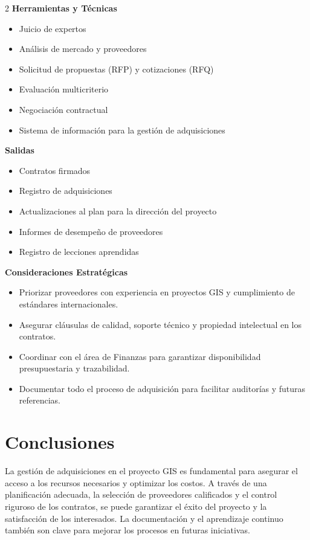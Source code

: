 \begin{multicols}{2}
\textbf{Herramientas y Técnicas}
\begin{itemize}
    \item Juicio de expertos
    \item Análisis de mercado y proveedores
    \item Solicitud de propuestas (RFP) y cotizaciones (RFQ)
    \item Evaluación multicriterio
    \item Negociación contractual
    \item Sistema de información para la gestión de adquisiciones
\end{itemize}

\textbf{Salidas}
\begin{itemize}
    \item Contratos firmados
    \item Registro de adquisiciones
    \item Actualizaciones al plan para la dirección del proyecto
    \item Informes de desempeño de proveedores
    \item Registro de lecciones aprendidas
\end{itemize}

\textbf{Consideraciones Estratégicas}
\begin{itemize}
    \item Priorizar proveedores con experiencia en proyectos GIS y cumplimiento de estándares internacionales.
    \item Asegurar cláusulas de calidad, soporte técnico y propiedad intelectual en los contratos.
    \item Coordinar con el área de Finanzas para garantizar disponibilidad presupuestaria y trazabilidad.
    \item Documentar todo el proceso de adquisición para facilitar auditorías y futuras referencias.
\end{itemize}

\end{multicols}

\section{Conclusiones}

La gestión de adquisiciones en el proyecto GIS es fundamental para asegurar el acceso a los recursos necesarios y optimizar los costos. A través de una planificación adecuada, la selección de proveedores calificados y el control riguroso de los contratos, se puede garantizar el éxito del proyecto y la satisfacción de los interesados. La documentación y el aprendizaje continuo también son clave para mejorar los procesos en futuras iniciativas.

